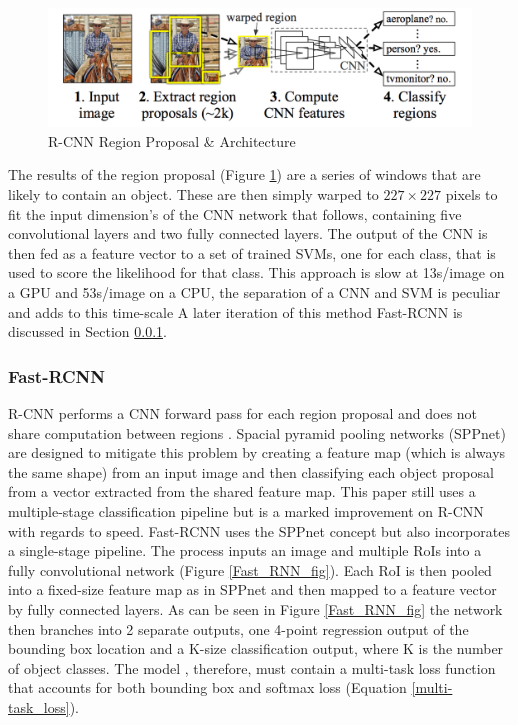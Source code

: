 \documentclass[11pt,twoside]{report}
\begin{document}
\noindent \begin{figure}[h!]
	\includegraphics[width = 1.0\hsize]{./figures/region_prop.png}
	\caption{R-CNN Region Proposal \& Architecture \cite{DBLP:journals/corr/GirshickDDM13}}
	\label{Selective_search}
\end{figure}

The results of the region proposal (Figure \ref{Selective_search}) are a series of windows that are likely to contain an object. These are then simply warped to $227 \times 227$ pixels to fit the input dimension's of the CNN network that follows, containing five convolutional layers and two fully connected layers. The output of the CNN is then fed as a feature vector to a set of trained SVMs, one for each class, that is used to score the likelihood for that class. This approach is slow at 13s/image on a GPU and 53s/image on a CPU, the separation of a CNN and SVM is peculiar and adds to this time-scale A later iteration of this method Fast-RCNN is discussed in Section \ref{Fast_RCNN}.

\subsubsection{Fast-RCNN} \label{Fast_RCNN}

R-CNN performs a CNN forward pass for each region proposal and does not share computation between regions \cite{DBLP:journals/corr/Girshick15}. Spacial pyramid pooling networks (SPPnet) \cite{DBLP:journals/corr/HeZR014} are designed to mitigate this problem by creating a feature map (which is always the same shape) from an input image and then classifying each object proposal from a vector extracted from the shared feature map. This paper still uses a multiple-stage classification pipeline but is a marked improvement on R-CNN with regards to speed. 
\newline \newline
Fast-RCNN uses the SPPnet concept but also incorporates a single-stage pipeline. The process inputs an image and multiple RoIs into a fully convolutional network (Figure \ref{Fast_RNN_fig}). Each RoI is then pooled into a fixed-size feature map as in SPPnet and then mapped to a feature vector by fully connected layers. As can be seen in Figure \ref{Fast_RNN_fig} the network then branches into 2 separate outputs, one 4-point regression output of the bounding box location and a K-size classification output, where K is the number of object classes. The model , therefore, must contain a multi-task loss function that accounts for both bounding box and softmax loss (Equation \ref{multi-task_loss}).
\end{document}

